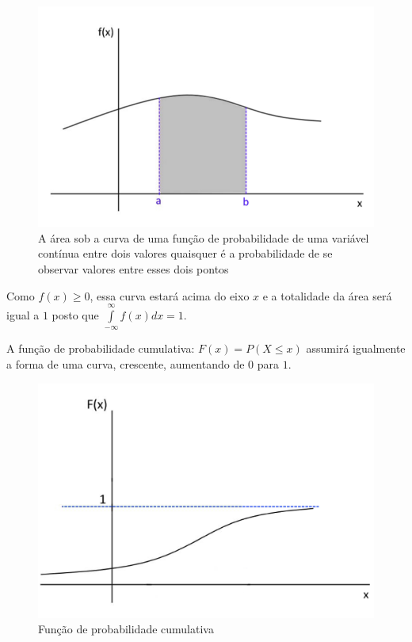 \documentclass[
]{book}
\begin{document}
\begin{figure}

{\centering \includegraphics[width=0.6\linewidth]{images5/func_dist_cont} 

}

\caption{A área sob a curva de uma função de probabilidade de uma variável contínua entre dois valores quaisquer é a probabilidade de se observar valores entre esses dois pontos}\label{fig:unnamed-chunk-76}
\end{figure}

\hfill\break

Como \(f(x) \geq 0\), essa curva estará acima do eixo \(x\) e a totalidade da área será igual a \(1\) posto que \(\underset{-\infty }{\overset{\infty }{\int }}f\left(x\right)dx = 1\).

\hfill\break

A função de probabilidade cumulativa: \(F(x) = P(X \leq x)\) assumirá igualmente a forma de uma curva, crescente, aumentando de \(0\) para \(1\).

\hfill\break

\begin{figure}

{\centering \includegraphics[width=0.6\linewidth]{images5/func_dist_cont_cum} 

}

\caption{Função de probabilidade cumulativa}\label{fig:unnamed-chunk-77}
\end{figure}
\end{document}
